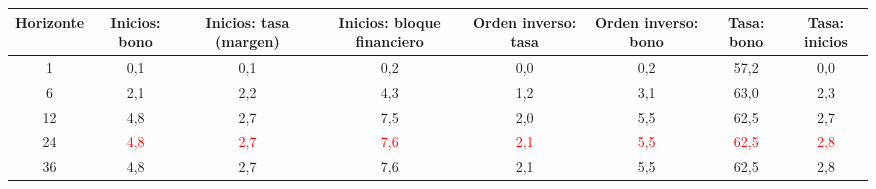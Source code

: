 \begin{tabular}{cccccccc}
\toprule
Horizonte & Inicios: bono & Inicios: tasa (margen) & Inicios: bloque financiero & Orden inverso: tasa & Orden inverso: bono & Tasa: bono & Tasa: inicios
\\ \midrule
1 & 0{,}1 & 0{,}1 & 0{,}2 & 0{,}0 & 0{,}2 & 57{,}2 & 0{,}0 \\
6 & 2{,}1 & 2{,}2 & 4{,}3 & 1{,}2 & 3{,}1 & 63{,}0 & 2{,}3 \\
12 & 4{,}8 & 2{,}7 & 7{,}5 & 2{,}0 & 5{,}5 & 62{,}5 & 2{,}7 \\
24 & \textcolor{red}{4{,}8} & \textcolor{red}{2{,}7} & \textcolor{red}{7{,}6} & \textcolor{red}{2{,}1} & \textcolor{red}{5{,}5} & \textcolor{red}{62{,}5} & \textcolor{red}{2{,}8} \\
36 & 4{,}8 & 2{,}7 & 7{,}6 & 2{,}1 & 5{,}5 & 62{,}5 & 2{,}8 \\
\bottomrule
\end{tabular}
